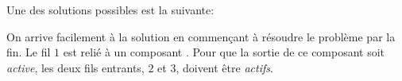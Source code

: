 {{%
\section*{\BrochureSolution}
Une des solutions possibles est la suivante:

{\centering%
\par}

On arrive facilement à la solution en commençant à résoudre le problème par la fin. Le fil $1$ est relié à un composant \raisebox{\dimexpr -0.5ex -0.6ex \relax}{}. Pour que la sortie de ce composant soit \emph{active}, les deux fils entrants, $2$ et $3$, doivent être \emph{actifs}.

}}
